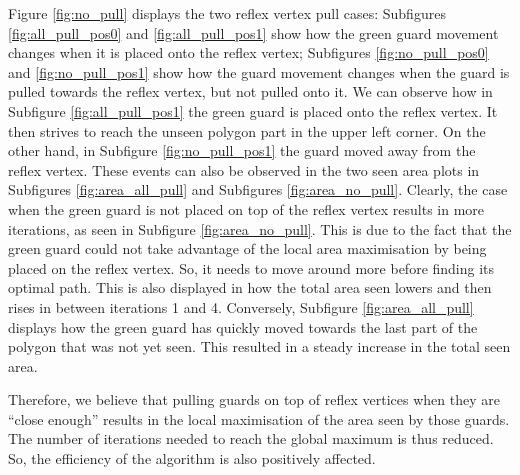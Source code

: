Figure \ref{fig:no_pull} displays the two reflex vertex pull cases: Subfigures \ref{fig:all_pull_pos0} and \ref{fig:all_pull_pos1} show how the green guard movement changes when it is placed onto the reflex vertex; Subfigures \ref{fig:no_pull_pos0} and \ref{fig:no_pull_pos1} show how the guard movement changes when the guard is pulled towards the reflex vertex, but not pulled onto it. We can observe how in Subfigure \ref{fig:all_pull_pos1} the green guard is placed onto the reflex vertex. It then strives to reach the unseen polygon part in the upper left corner. On the other hand, in Subfigure \ref{fig:no_pull_pos1} the guard moved away from the reflex vertex. 
These events can also be observed in the two seen area plots in Subfigures \ref{fig:area_all_pull} and Subfigures \ref{fig:area_no_pull}. Clearly, the case when the green guard is not placed on top of the reflex vertex results in more iterations, as seen in Subfigure \ref{fig:area_no_pull}. This is due to the fact that the green guard could not take advantage of the local area maximisation by being placed on the reflex vertex. So, it needs to move around more before finding its optimal path. This is also displayed in how the total area seen lowers and then rises in between iterations 1 and 4. Conversely, Subfigure \ref{fig:area_all_pull} displays how the green guard has quickly moved towards the last part of the polygon that was not yet seen. This resulted in a steady increase in the total seen area.

Therefore, we believe that pulling guards on top of reflex vertices when they are ``close enough'' results in the local maximisation of the area seen by those guards. The number of iterations needed to reach the global maximum is thus reduced. So, the efficiency of the algorithm is also positively affected.

